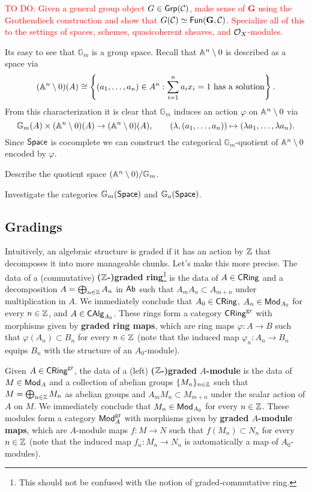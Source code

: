 \documentclass[11pt]{article}
\newcommand{\CC}{\mathcal{C}}
\newcommand{\GG}{\mathbb{G}}
\renewcommand{\phi}{\varphi}
\begin{document}
\textcolor{red}{TO DO: Given a general group object $G\in\Grp(\CC)$, make sense of $\mathbf{G}$ using the Grothendieck construction and show that $G(\CC)\simeq\Fun(\mathbf{G},\CC)$. Specialize all of this to the settings of spaces, schemes, quasicoherent sheaves, and $\mathcal{O}_X$-modules.}

Its easy to see that $\GG_m$ is a group space. Recall that $\mathbb{A}^n\setminus0$ is described as a space via 
$$(\mathbb{A}^n\setminus0)(A)\cong\left\{(a_1,\ldots,a_n)\in A^n : \sum_{i=1}^na_ix_i=1\textrm{ has a solution}\right\}.$$
From this characterization it is clear that $\GG_m$ induces an action $\phi$ on $\mathbb{A}^n\setminus0$ via
$$\GG_m(A)\times(\A^n\setminus0)(A)\to(\A^n\setminus0)(A),\qquad (\lambda,(a_1,\ldots,a_n))\mapsto(\lambda a_1,\ldots,\lambda a_n).$$
Since $\operatorname{\mathsf{Space}}$ is cocomplete we can construct the categorical $\GG_m$-quotient of $\mathbb{A}^n\setminus0$ encoded by $\phi$. 

\begin{exercise}
Describe the quotient space $(\A^n\setminus0)/\GG_m$.
\end{exercise}

\begin{exercise}
Investigate the categories $\GG_m(\Space)$ and $\GG_a(\Space)$.
\end{exercise}

\subsection{Gradings}
Intuitively, an algebraic structure is graded if it has an action by $\mathbb{Z}$ that decomposes it into more manageable chunks. Let's make this more precise. The data of a (commutative) \textbf{($\mathbb{Z}$-)graded ring}\footnote{This should not be confused with the notion of graded-commutative ring.} is the data of $A\in\operatorname{\mathsf{CRing}}$ and a decomposition $A=\bigoplus_{n\in\mathbb{Z}}A_n$ in $\operatorname{\mathsf{Ab}}$ such that $A_mA_n\subset A_{m+n}$ under multiplication in $A$. We immediately conclude that $A_0\in\operatorname{\mathsf{CRing}}$, $A_n\in\operatorname{\mathsf{Mod}}_{A_0}$ for every $n\in\mathbb{Z}$, and $A\in\operatorname{\mathsf{CAlg}}_{A_0}$. These rings form a category $\operatorname{\mathsf{CRing}}^{\operatorname{gr}}$ with morphisms given by \textbf{graded ring maps}, which are ring maps $\phi: A\to B$ such that $\phi(A_n)\subset B_n$ for every $n\in\mathbb{Z}$ (note that the induced map $\phi_n: A_n\to B_n$ equips $B_n$ with the structure of an $A_0$-module). 

Given $A\in\operatorname{\mathsf{CRing}}^{\operatorname{gr}}$, the data of a (left) \textbf{($\mathbb{Z}$-)graded $A$-module} is the data of $M\in\operatorname{\mathsf{Mod}}_A$ and a collection of abelian groups $\{M_n\}_{n\in\mathbb{Z}}$ such that $M=\bigoplus_{n\in\mathbb{Z}}M_n$ as abelian groups and $A_mM_n\subset M_{m+n}$ under the scalar action of $A$ on $M$. We immediately conclude that $M_n\in\operatorname{\mathsf{Mod}}_{A_0}$ for every $n\in\mathbb{Z}$. These modules form a category $\operatorname{\mathsf{Mod}}_A^{\operatorname{gr}}$ with morphisms given by \textbf{graded $A$-module maps}, which are $A$-module maps $f: M\to N$ such that $f(M_n)\subset N_n$ for every $n\in\mathbb{Z}$ (note that the induced map $f_n: M_n\to N_n$ is automatically a map of $A_0$-modules). 
\end{document}
